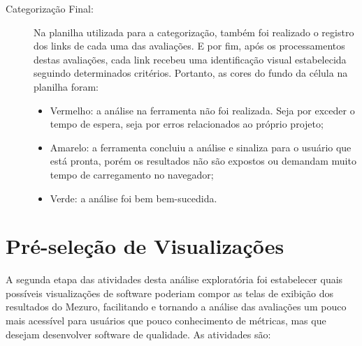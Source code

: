 \begin{description}
  \item [Categorização Final:]
    Na planilha utilizada para a categorização, também foi realizado o registro
    dos links de cada uma das avaliações. E por fim, após os processamentos
    destas avaliações, cada link recebeu uma identificação visual estabelecida
    seguindo determinados critérios. Portanto, as
    cores do fundo da célula na planilha foram:
    \begin{itemize}
      \item Vermelho: a análise na ferramenta não foi realizada. Seja por
            exceder o tempo de espera, seja por erros relacionados ao próprio
            projeto;
      \item Amarelo: a ferramenta concluiu a análise e sinaliza para o usuário
            que está pronta, porém os resultados não são expostos ou demandam
            muito tempo de carregamento no navegador;
      \item Verde: a análise foi bem bem-sucedida.
    \end{itemize}
\end{description}


\section{Pré-seleção de Visualizações}

A segunda etapa das atividades desta análise exploratória foi estabelecer quais
possíveis visualizações de software poderiam compor as telas de exibição dos
resultados do Mezuro, facilitando e tornando a análise das avaliações um pouco
mais acessível para usuários que pouco conhecimento de métricas, mas que desejam
desenvolver software de qualidade. As atividades são:

